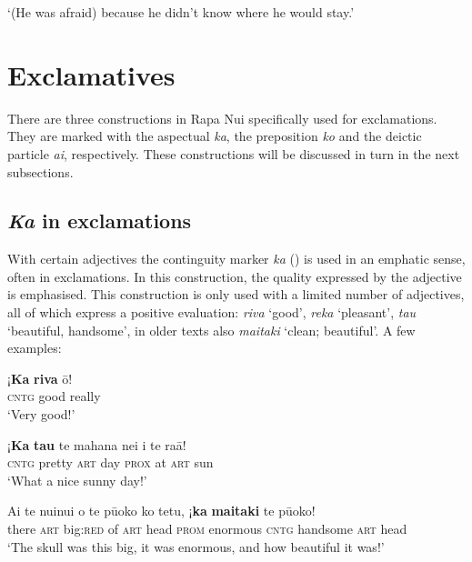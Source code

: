 \glt 
‘(He was afraid) because he didn’t know where he would stay.’ \textstyleExampleref{[R314.016]} 
\z
{}

\section{Exclamatives}\label{sec:10.4}
There are three constructions in Rapa Nui specifically used for exclamations. They are marked with the aspectual \textit{ka}, the preposition \textit{ko} and the deictic particle \textit{{\ꞌ}ai}, respectively. These constructions will be discussed in turn in the next subsections.

\subsection{\textit{Ka} in exclamations}\label{sec:10.4.1}
With certain adjectives the continguity marker \textit{ka} () is used in an emphatic sense, often in exclamations. In this construction, the quality expressed by the adjective is emphasised. This construction is only used with a limited number of adjectives, all of which express a positive evaluation: \textit{riva} ‘good’, \textit{reka} ‘pleasant’, \textit{tau} ‘beautiful, handsome’, in older texts also \textit{ma{\ꞌ}itaki} ‘clean; beautiful’. A few examples:

\ea\label{ex:10.77}
\gll ¡\textbf{Ka} \textbf{riva} {\ꞌ}ō! \\
\textsc{cntg} good really \\

\glt 
‘Very good!’ \textstyleExampleref{[R334.319]} 
\z

\ea\label{ex:10.78}
\gll ¡\textbf{Ka} \textbf{tau} te mahana nei {\ꞌ}i te ra{\ꞌ}ā! \\
\textsc{cntg} pretty \textsc{art} day \textsc{prox} at \textsc{art} sun \\

\glt 
‘What a nice sunny day!’ \textstyleExampleref{[Notes]}
\z

\ea\label{ex:10.79}
\gll {\ꞌ}Ai te nuinui o te pū{\ꞌ}oko ko tetu, ¡\textbf{ka} \textbf{ma{\ꞌ}itaki} te pū{\ꞌ}oko! \\
there \textsc{art} big:\textsc{red} of \textsc{art} head \textsc{prom} enormous \textsc{cntg} handsome \textsc{art} head \\

\glt
‘The skull was this big, it was enormous, and how beautiful it was!’ \textstyleExampleref{[Ley-2-10.010]}
\z

